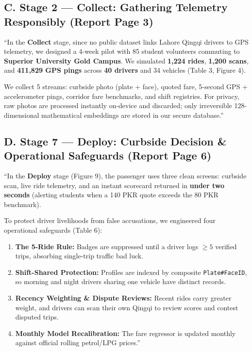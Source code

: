 \documentclass[10pt, a4paper]{article}
\begin{document}
\subsection{C. Stage 2 --- Collect: Gathering Telemetry Responsibly (Report Page 3)}
\begin{speaking}
\footnotesize
``In the \textbf{Collect} stage, since no public dataset links Lahore Qingqi drivers to GPS telemetry, we designed a 4-week pilot with 85 student volunteers commuting to \textbf{Superior University Gold Campus}. We simulated \textbf{1,224 rides}, \textbf{1,200 scans}, and \textbf{411,829 GPS pings} across \textbf{40 drivers} and 34 vehicles (Table 3, Figure 4).

We collect 5 streams: curbside photo (plate + face), quoted fare, 5-second GPS + accelerometer pings, corridor fare benchmarks, and shift registries. For privacy, raw photos are processed instantly on-device and discarded; only irreversible 128-dimensional mathematical embeddings are stored in our secure database.''
\end{speaking}

\newpage

\subsection{D. Stage 7 --- Deploy: Curbside Decision \& Operational Safeguards (Report Page 6)}
\begin{speaking}
\footnotesize
``In the \textbf{Deploy} stage (Figure 9), the passenger uses three clean screens: curbside scan, live ride telemetry, and an instant scorecard returned in \textbf{under two seconds} (alerting students when a 140 PKR quote exceeds the 80 PKR benchmark).

To protect driver livelihoods from false accusations, we engineered four operational safeguards (Table 6):
\begin{enumerate}\setlength{\itemsep}{0.8pt}\setlength{\parskip}{0pt}
  \item \textbf{The 5-Ride Rule:} Badges are suppressed until a driver logs \(\ge 5\) verified trips, absorbing single-trip traffic bad luck.
  \item \textbf{Shift-Shared Protection:} Profiles are indexed by composite \texttt{Plate\#FaceID}, so morning and night drivers sharing one vehicle have distinct records.
  \item \textbf{Recency Weighting \& Dispute Reviews:} Recent rides carry greater weight, and drivers can scan their own Qingqi to review scores and contest disputed trips.
  \item \textbf{Monthly Model Recalibration:} The fare regressor is updated monthly against official rolling petrol/LPG prices.''
\end{enumerate}
\end{speaking}
\end{document}
